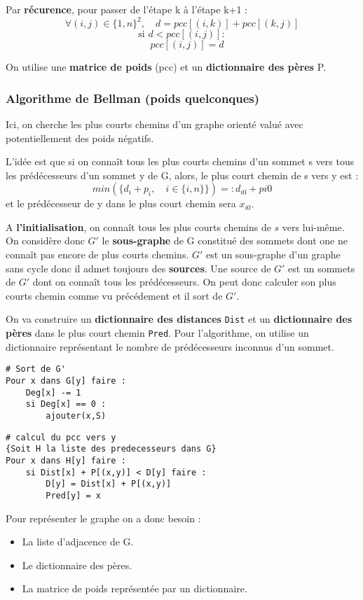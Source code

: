 Par \textbf{récurence}, pour passer de l'étape k à l'étape k+1 :
    \[ \forall (i,j) \in \{1,n\}^2, \quad d = pcc[(i,k)] + pcc[(k,j)] \] 
    \[ \text{si } d < pcc[(i,j)]: \] 
    \[ \quad pcc[(i,j)] = d \] 

On utilise une \textbf{matrice de poids} (pcc) et un \textbf{dictionnaire des pères} P. 


\subsubsection{Algorithme de Bellman (poids quelconques)}

Ici, on cherche les plus courts chemins d'un graphe orienté valué avec potentiellement des poids négatifs. 

L'idée est que si on connaît tous les plus courts chemins d'un sommet s vers tous les prédécesseurs d'un sommet y de G, 
alors, le plus court chemin de s vers y est : 
    \[ min (\{d_i + p_i, \quad  i \in \{i,n\}\})=: d_{i0} + p{i0}\]
et le prédécesseur de y dans le plus court chemin sera $x_{i0}$. 

A \textbf{l'initialisation}, on connaît tous les plus courts chemins de $s$ vers lui-même. 
On considère donc $G'$ le \textbf{sous-graphe} de G constitué des sommets dont one ne connaît pas encore de plus courts chemins. 
$G'$ est un sous-graphe d'un graphe sans cycle donc il admet toujours des \textbf{sources}. 
Une source de $G'$ est un sommets de $G'$ dont on connaît tous les prédécesseurs. On peut donc calculer son plus courts 
chemin comme vu précédement et il sort de $G'$. 

On va construire un \textbf{dictionnaire des distances} \texttt{Dist} et un \textbf{dictionnaire des pères} dans le plus court chemin \texttt{Pred}. 
Pour l'algorithme, on utilise un dictionnaire représentant le nombre de prédécesseurs inconnus d'un sommet. 

\begin{lstlisting}
# Sort de G'
Pour x dans G[y] faire :
    Deg[x] -= 1
    si Deg[x] == 0 :
        ajouter(x,S)
\end{lstlisting}

\begin{lstlisting}
# calcul du pcc vers y
{Soit H la liste des predecesseurs dans G}
Pour x dans H[y] faire :
    si Dist[x] + P[(x,y)] < D[y] faire :
        D[y] = Dist[x] + P[(x,y)]
        Pred[y] = x 
\end{lstlisting}

Pour représenter le graphe on a donc besoin :
\begin{itemize}
    \item La liste d'adjacence de G.
    \item Le dictionnaire des pères.
    \item La matrice de poids représentée par un dictionnaire. 
\end{itemize}

